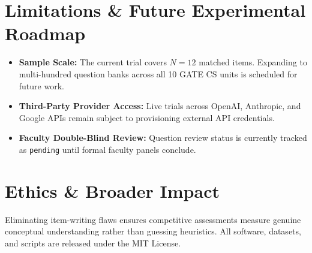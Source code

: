 \documentclass[10pt,twocolumn,letterpaper]{article}
\begin{document}
\section{Limitations \& Future Experimental Roadmap}
\begin{itemize}
    \item \textbf{Sample Scale:} The current trial covers $N=12$ matched items. Expanding to multi-hundred question banks across all 10 GATE CS units is scheduled for future work.
    \item \textbf{Third-Party Provider Access:} Live trials across OpenAI, Anthropic, and Google APIs remain subject to provisioning external API credentials.
    \item \textbf{Faculty Double-Blind Review:} Question review status is currently tracked as \texttt{pending} until formal faculty panels conclude.
\end{itemize}

\section{Ethics \& Broader Impact}
Eliminating item-writing flaws ensures competitive assessments measure genuine conceptual understanding rather than guessing heuristics. All software, datasets, and scripts are released under the MIT License.



\end{document}
